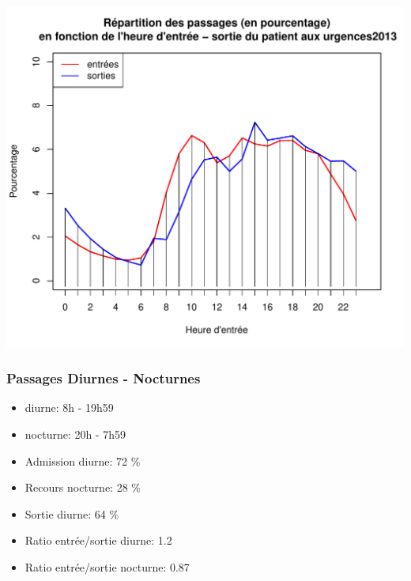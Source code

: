 \documentclass[12pt,english,french,twoside]{book}\usepackage[]{graphicx}\usepackage[]{color}
\makeatletter
\def\maxwidth{ %
  \ifdim\Gin@nat@width>\linewidth
    \linewidth
  \else
    \Gin@nat@width
  \fi
}
\newenvironment{knitrout}{}{} %
\makeatother
\begin{document}
 \begin{center}
\begin{knitrout}
\color{fgcolor}
\includegraphics[width=\maxwidth]{figure/sau_arrive_depart} 

\end{knitrout}

\label{fig:sau_arrive_depart}
\end{center}

 
\subsubsection*{Passages Diurnes - Nocturnes}

\begin{itemize}
  \item diurne: 8h - 19h59
  \item nocturne: 20h - 7h59
\end{itemize}





\begin{boxedminipage}{10cm}
\begin{itemize}
  \item Admission diurne: 72 \%
  \item Recours nocturne: 28 \%
  \item Sortie diurne:    64 \%
  \item Ratio entrée/sortie diurne: 1.2
  \item Ratio entrée/sortie nocturne: 0.87
\end{itemize}
\end{boxedminipage}
\end{document}
